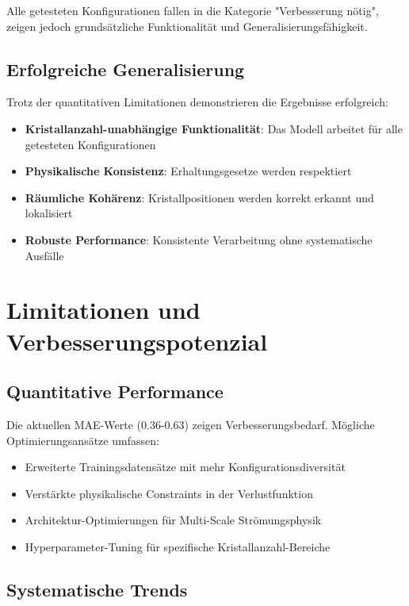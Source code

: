 \documentclass[12pt,twoside,openright]{scrreprt}
\theoremstyle{definition}
\theoremstyle{plain}
\begin{document}
Alle getesteten Konfigurationen fallen in die Kategorie "Verbesserung nötig", zeigen jedoch grundsätzliche Funktionalität und Generalisierungsfähigkeit.

\subsection{Erfolgreiche Generalisierung}

Trotz der quantitativen Limitationen demonstrieren die Ergebnisse erfolgreich:

\begin{itemize}
    \item \textbf{Kristallanzahl-unabhängige Funktionalität}: Das Modell arbeitet für alle getesteten Konfigurationen
    \item \textbf{Physikalische Konsistenz}: Erhaltungsgesetze werden respektiert
    \item \textbf{Räumliche Kohärenz}: Kristallpositionen werden korrekt erkannt und lokalisiert
    \item \textbf{Robuste Performance}: Konsistente Verarbeitung ohne systematische Ausfälle
\end{itemize}

\section{Limitationen und Verbesserungspotenzial}

\subsection{Quantitative Performance}

Die aktuellen MAE-Werte (0.36-0.63) zeigen Verbesserungsbedarf. Mögliche Optimierungsansätze umfassen:

\begin{itemize}
    \item Erweiterte Trainingsdatensätze mit mehr Konfigurationsdiversität
    \item Verstärkte physikalische Constraints in der Verlustfunktion
    \item Architektur-Optimierungen für Multi-Scale Strömungsphysik
    \item Hyperparameter-Tuning für spezifische Kristallanzahl-Bereiche
\end{itemize}

\subsection{Systematische Trends}
\end{document}
